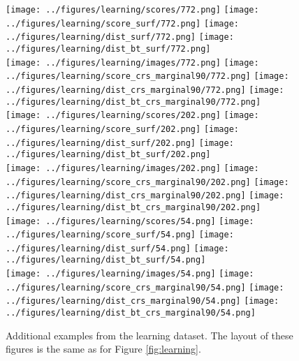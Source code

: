 \begin{figure}[h!]
	\begin{center}
		\texttt{[image: ../figures/learning/scores/772.png]}
		\texttt{[image: ../figures/learning/score\_surf/772.png]}	\texttt{[image: ../figures/learning/dist\_surf/772.png]}
		\texttt{[image: ../figures/learning/dist\_bt\_surf/772.png]}\\
		\texttt{[image: ../figures/learning/images/772.png]}
		\texttt{[image: ../figures/learning/score\_crs\_marginal90/772.png]}
		\texttt{[image: ../figures/learning/dist\_crs\_marginal90/772.png]}
		\texttt{[image: ../figures/learning/dist\_bt\_crs\_marginal90/772.png]}\\
		\vspace{0.5cm}
		\texttt{[image: ../figures/learning/scores/202.png]}
		\texttt{[image: ../figures/learning/score\_surf/202.png]}	\texttt{[image: ../figures/learning/dist\_surf/202.png]}
		\texttt{[image: ../figures/learning/dist\_bt\_surf/202.png]}\\
		\texttt{[image: ../figures/learning/images/202.png]}
		\texttt{[image: ../figures/learning/score\_crs\_marginal90/202.png]}
		\texttt{[image: ../figures/learning/dist\_crs\_marginal90/202.png]}
		\texttt{[image: ../figures/learning/dist\_bt\_crs\_marginal90/202.png]}\\
			\vspace{0.5cm}
		\texttt{[image: ../figures/learning/scores/54.png]}
		\texttt{[image: ../figures/learning/score\_surf/54.png]}	\texttt{[image: ../figures/learning/dist\_surf/54.png]}
		\texttt{[image: ../figures/learning/dist\_bt\_surf/54.png]}\\
		\texttt{[image: ../figures/learning/images/54.png]}
		\texttt{[image: ../figures/learning/score\_crs\_marginal90/54.png]}
		\texttt{[image: ../figures/learning/dist\_crs\_marginal90/54.png]}
		\texttt{[image: ../figures/learning/dist\_bt\_crs\_marginal90/54.png]}
	\end{center}
	\caption{Additional examples from the learning dataset. The layout of these figures is the same as for Figure \ref{fig:learning}.}
	\label{fig:learning2}
\end{figure}

